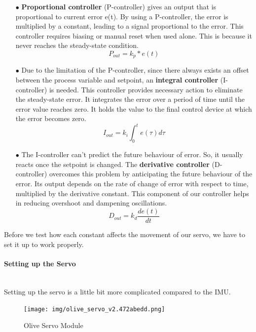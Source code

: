 \documentclass{article}
\begin{document}
\begin{enumerate}
    \item[$\bullet$]\textbf{Proportional controller} (P-controller) gives an output that is proportional to current error e(t). By using a P-controller, the error is multiplied by a constant, leading to a signal proportional to the error. This controller requires biasing or manual reset when used alone. This is because it never reaches the steady-state condition. 
    \begin{equation}
        P_{out} = k_p * e(t)
    \end{equation}
    \item[$\bullet$] Due to the limitation of the P-controller, since there always exists an offset between the process variable and setpoint, an \textbf{integral controller} (I-controller) is needed. This controller provides necessary action to eliminate the steady-state error.  It integrates the error over a period of time until the error value reaches zero. It holds the value to the final control device at which the error becomes zero.
    \begin{equation}
        I_{out} = k_i \int_{0}^{t} e(\tau) d\tau   
    \end{equation}

    \item[$\bullet$]The I-controller can’t predict the future behaviour of error. So, it usually reacts once the setpoint is changed. The \textbf{derivative controller} (D-controller) overcomes this problem by anticipating the future behaviour of the error. Its output depends on the rate of change of error with respect to time, multiplied by the derivative constant. This component of our controller helps in reducing overshoot and dampening oscillations.
    \begin{equation}
        D_{out} = k_d \frac{de(t)}{dt}
    \end{equation}
\end{enumerate}
Before we test how each constant affects the movement of our servo, we have to set it up to work properly.

\paragraph{Setting up the Servo}~\\
Setting up the servo is a little bit more complicated compared to the IMU.
\begin{figure}[H]
    \centering
    \texttt{[image: img/olive\_servo\_v2.472abedd.png]}
    \caption[Olive Servo Module]{Olive Servo Module\footnotemark}
    \label{fig:Servo}
\end{figure}
\end{document}

